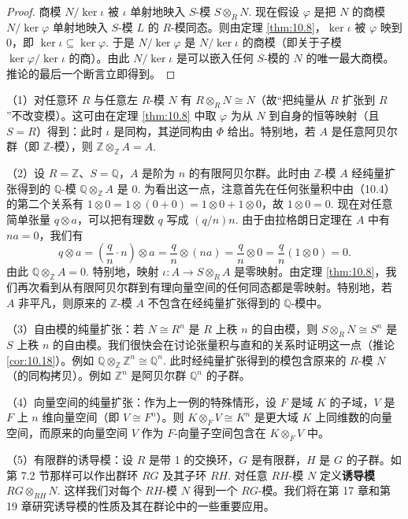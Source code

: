 \begin{proof}
商模 \(N/\ker\iota\) 被 \(\iota\) 单射地映入 \(S\)-模 \(S \otimes_R N\). 现在假设 \(\varphi\) 是把 \(N\) 的商模 \(N/\ker\varphi\) 单射地映入 \(S\)-模 \(L\) 的 \(R\)-模同态。则由定理 \ref{thm:10.8}，\(\ker\iota\) 被 \(\varphi\) 映到 0，即 \(\ker\iota \subseteq \ker\varphi\). 于是 \(N/\ker\varphi\) 是 \(N/\ker\iota\) 的商模（即关于子模 \(\ker\varphi/\ker\iota\) 的商）。由此 \(N/\ker\iota\) 是可以嵌入任何 \(S\)-模的 \(N\) 的唯一最大商模。推论的最后一个断言立即得到。
\end{proof}

\begin{example}
（1）对任意环 \(R\) 与任意左 \(R\)-模 \(N\) 有 \(R \otimes_R N \cong N\)（故“把纯量从 \(R\) 扩张到 \(R\)”不改变模）。这可由在定理 \ref{thm:10.8} 中取 \(\varphi\) 为从 \(N\) 到自身的恒等映射（且 \(S = R\)）得到：此时 \(\iota\) 是同构，其逆同构由 \(\Phi\) 给出。特别地，若 \(A\) 是任意阿贝尔群（即 \(\mathbb{Z}\)-模），则 \(\mathbb{Z} \otimes_{\mathbb{Z}} A = A\).

（2）设 \(R = \mathbb{Z}\)、\(S = \mathbb{Q}\)，\(A\) 是阶为 \(n\) 的有限阿贝尔群。此时由 \(\mathbb{Z}\)-模 \(A\) 经纯量扩张得到的 \(\mathbb{Q}\)-模 \(\mathbb{Q} \otimes_{\mathbb{Z}} A\) 是 0. 为看出这一点，注意首先在任何张量积中由（10.4）的第二个关系有 \(1 \otimes 0 = 1 \otimes (0+0) = 1 \otimes 0+1 \otimes 0\)，故 \(1 \otimes 0 = 0\). 现在对任意简单张量 \(q \otimes a\)，可以把有理数 \(q\) 写成 \((q/n)n\). 由于由拉格朗日定理在 \(A\) 中有 \(na = 0\)，我们有
\[
q \otimes a = \left(\frac{q}{n}\cdot n\right) \otimes a = \frac{q}{n} \otimes (na) = \frac{q}{n} \otimes 0 = \frac{q}{n}(1 \otimes 0) = 0.
\]
由此 \(\mathbb{Q} \otimes_{\mathbb{Z}} A = 0\). 特别地，映射 \(\iota : A \to S \otimes_R A\) 是零映射。由定理 \ref{thm:10.8}，我们再次看到从有限阿贝尔群到有理向量空间的任何同态都是零映射。特别地，若 \(A\) 非平凡，则原来的 \(\mathbb{Z}\)-模 \(A\) 不包含在经纯量扩张得到的 \(\mathbb{Q}\)-模中。

（3）自由模的纯量扩张：若 \(N \cong R^n\) 是 \(R\) 上秩 \(n\) 的自由模，则 \(S \otimes_R N \cong S^n\) 是 \(S\) 上秩 \(n\) 的自由模。我们很快会在讨论张量积与直和的关系时证明这一点（推论 \ref{cor:10.18}）。例如 \(\mathbb{Q} \otimes_{\mathbb{Z}} \mathbb{Z}^n \cong \mathbb{Q}^n\). 此时经纯量扩张得到的模包含原来的 \(R\)-模 \(N\)（的同构拷贝）。例如 \(\mathbb{Z}^n\) 是阿贝尔群 \(\mathbb{Q}^n\) 的子群。

（4）向量空间的纯量扩张：作为上一例的特殊情形，设 \(F\) 是域 \(K\) 的子域，\(V\) 是 \(F\) 上 \(n\) 维向量空间（即 \(V \cong F^n\)）。则 \(K \otimes_F V \cong K^n\) 是更大域 \(K\) 上同维数的向量空间，而原来的向量空间 \(V\) 作为 \(F\)-向量子空间包含在 \(K \otimes_F V\) 中。

（5）有限群的诱导模：设 \(R\) 是带 1 的交换环，\(G\) 是有限群，\(H\) 是 \(G\) 的子群。如第 7.2 节那样可以作出群环 \(RG\) 及其子环 \(RH\). 对任意 \(RH\)-模 \(N\) 定义\textbf{诱导模} \(RG \otimes_{RH} N\). 这样我们对每个 \(RH\)-模 \(N\) 得到一个 \(RG\)-模。我们将在第 17 章和第 19 章研究诱导模的性质及其在群论中的一些重要应用。
\end{example}

